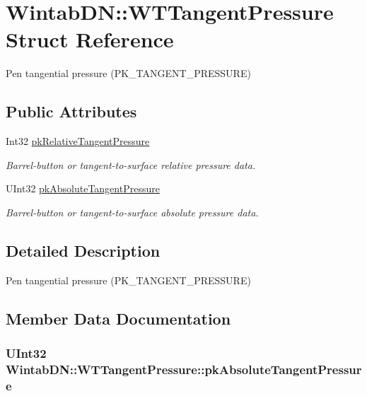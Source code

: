 \hypertarget{struct_wintab_d_n_1_1_w_t_tangent_pressure}{
\section{WintabDN::WTTangentPressure Struct Reference}
\label{struct_wintab_d_n_1_1_w_t_tangent_pressure}
}


Pen tangential pressure (PK\_\-TANGENT\_\-PRESSURE)  


\subsection*{Public Attributes}
\begin{DoxyCompactItemize}
\item 
Int32 \hyperlink{struct_wintab_d_n_1_1_w_t_tangent_pressure_a288b2232530d1fba63a412d6aa724b86}{pkRelativeTangentPressure}
\begin{DoxyCompactList}\small\item\em Barrel-\/button or tangent-\/to-\/surface relative pressure data. \item\end{DoxyCompactList}\item 
UInt32 \hyperlink{struct_wintab_d_n_1_1_w_t_tangent_pressure_a22b098780487d0d3f81d7630a38bbc09}{pkAbsoluteTangentPressure}
\begin{DoxyCompactList}\small\item\em Barrel-\/button or tangent-\/to-\/surface absolute pressure data. \item\end{DoxyCompactList}\end{DoxyCompactItemize}


\subsection{Detailed Description}
Pen tangential pressure (PK\_\-TANGENT\_\-PRESSURE) 

\subsection{Member Data Documentation}
\hypertarget{struct_wintab_d_n_1_1_w_t_tangent_pressure_a22b098780487d0d3f81d7630a38bbc09}{
\subsubsection[{pkAbsoluteTangentPressure}]{\setlength{\rightskip}{0pt plus 5cm}UInt32 {\bf WintabDN::WTTangentPressure::pkAbsoluteTangentPressure}}}
\label{struct_wintab_d_n_1_1_w_t_tangent_pressure_a22b098780487d0d3f81d7630a38bbc09}


